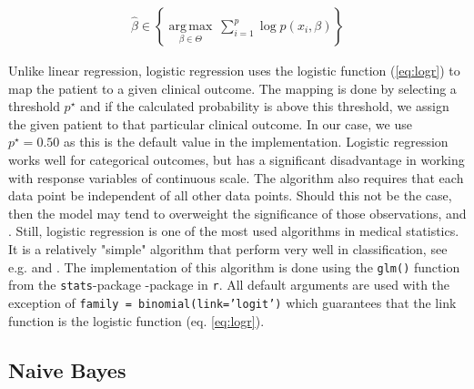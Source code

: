 \documentclass[../thesis.tex]{subfiles}
\begin{document}
\begin{align}
    \hat{\beta} \in \left\{ {\underset {\beta \in \Theta }{\operatorname {arg\,max} }}\ \sum_{i=1}^p\log p(x_i, \beta)\right\}
\end{align}

\noindent Unlike linear regression, logistic regression uses the logistic function (\ref{eq:logr}) to map the patient to a given clinical outcome. The mapping is done by selecting a threshold $p^\star$ and if the calculated probability is above this threshold, we assign the given patient to that particular clinical outcome. In our case, we use $p^\star = 0.50$ as this is the default value in the implementation. Logistic regression works well for categorical outcomes, but has a significant disadvantage in working with response variables of continuous scale. The algorithm also requires that each data point be independent of all other data points. Should this not be the case, then the model may tend to overweight the significance of those observations, \cite{friedman2009elements} and \cite{james2013introduction}. Still, logistic regression is one of the most used algorithms in medical statistics. It is a relatively "simple" algorithm that perform very well in classification, see e.g. \cite{austin2013using} and \cite{zolfaghar2013big}. The implementation of this algorithm is done using the \texttt{glm()} function from the \texttt{stats}-package \cite{stats}-package in \texttt{r}. All default arguments are used with the exception of \texttt{family = binomial(link='logit')} which guarantees that the link function is the logistic function (eq. \ref{eq:logr}).

\subsection{Naive Bayes}
\label{subsec:nb}
\end{document}
